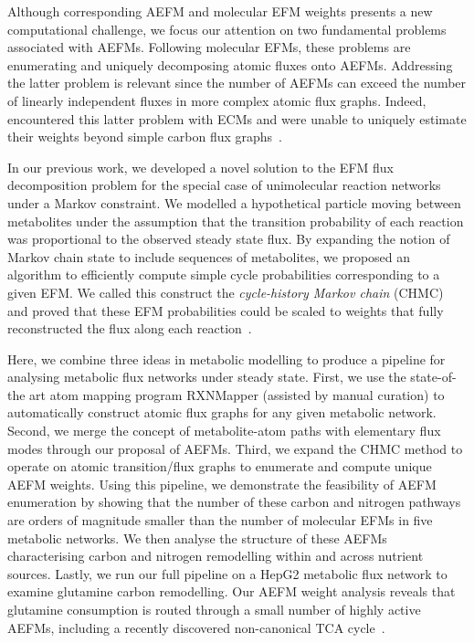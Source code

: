 \documentclass[12pt]{article}
\begin{document}
Although corresponding AEFM and molecular EFM weights presents a new
computational challenge, we focus our attention on two fundamental
problems associated with AEFMs. Following molecular EFMs, these problems
are enumerating and uniquely decomposing atomic fluxes onto AEFMs.
Addressing the latter problem is relevant since the number of AEFMs can
exceed the number of linearly independent fluxes in more complex atomic
flux graphs. Indeed, \citeauthor{PeyJon2012Itmd} encountered this latter
problem with ECMs and were unable to uniquely estimate their weights
beyond simple carbon flux graphs~\citep{PeyJon2012Itmd}.

In our previous work, we developed a novel solution to the EFM flux
decomposition problem for the special case of unimolecular reaction
networks under a Markov constraint. We modelled a hypothetical particle
moving between metabolites under the assumption that the transition
probability of each reaction was proportional to the observed steady state
flux. By expanding the notion of Markov chain state to include sequences
of metabolites, we proposed an algorithm to efficiently compute simple
cycle probabilities corresponding to a given EFM. We called this construct
the \emph{cycle-history Markov chain} (CHMC) and proved that these EFM
probabilities could be scaled to weights that fully reconstructed the flux
along each reaction~\citep{ChitpinJustinG2023AMct}.

Here, we combine three ideas in metabolic modelling to produce a pipeline
for analysing metabolic flux networks under steady state. First, we use
the state-of-the art atom mapping program RXNMapper (assisted by manual
curation) to automatically construct atomic flux graphs for any given
metabolic network. Second, we merge the concept of metabolite-atom paths
with elementary flux modes through our proposal of AEFMs. Third, we expand
the CHMC method to operate on atomic transition/flux graphs to enumerate
and compute unique AEFM weights. Using this pipeline, we demonstrate the
feasibility of AEFM enumeration by showing that the number of these carbon
and nitrogen pathways are orders of magnitude smaller than the number of
molecular EFMs in five metabolic networks. We then analyse the structure
of these AEFMs characterising carbon and nitrogen remodelling within and
across nutrient sources. Lastly, we run our full pipeline on a HepG2
metabolic flux network to examine glutamine carbon remodelling. Our AEFM
weight analysis reveals that glutamine consumption is routed through
a small number of highly active AEFMs, including a recently discovered
non-canonical TCA cycle~\citep{ArnoldPaigeK2022Anta}. 
\end{document}
